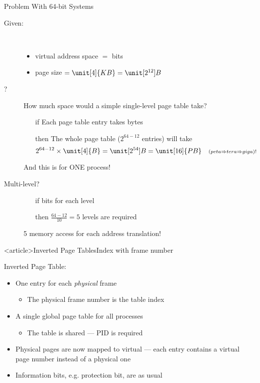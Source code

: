 \begin{frame}{Problem With 64-bit Systems}
  \begin{description}
  \item[Given:]\hfill\\[-2ex]
    \begin{itemize}
    \item virtual address space \(=\) \unit[64]{bits}
    \item page size \(= \unit[4]{KB} = \unit[2^{12}]{B}\)
    \end{itemize}
  \item[?] How much space would a simple single-level page table take?
    \begin{itemize}
    \item[if] Each page table entry takes \unit[4]{bytes}
    \item[then] The whole page table (\(2^{64-12}\) entries) will take
      \[%
        2^{64-12}\times{}\unit[4]{B}=\unit[2^{54}]{B}=\unit[16]{PB} \quad {\scriptstyle(peta \Rightarrow tera \Rightarrow giga)!}\]
    \end{itemize}
    And this is for ONE process!
  \item[Multi-level?]\hfill
    \begin{itemize}
    \item[if] \unit[10]{bits} for each level
    \item[then] \(\frac{64-12}{10}=5\) levels are required
    \end{itemize}
    5 memory access for each address translation!
  \end{description}
\end{frame}

\begin{frame}<article>{Inverted Page Tables}{Index with frame number}
  \begin{iblock}{Inverted Page Table:}
    \begin{itemize}
    \item One entry for each \emph{physical} frame
      \begin{itemize}
      \item The physical frame number is the table index
      \end{itemize}
    \item A single global page table for all processes
      \begin{itemize}
      \item The table is shared --- PID is required
      \end{itemize}
    \end{itemize}
  \end{iblock}
  \begin{itemize}
  \item Physical pages are now mapped to virtual --- each entry contains a virtual page
    number instead of a physical one
  \item Information bits, e.g. protection bit, are as usual
  \end{itemize}
\end{frame}

